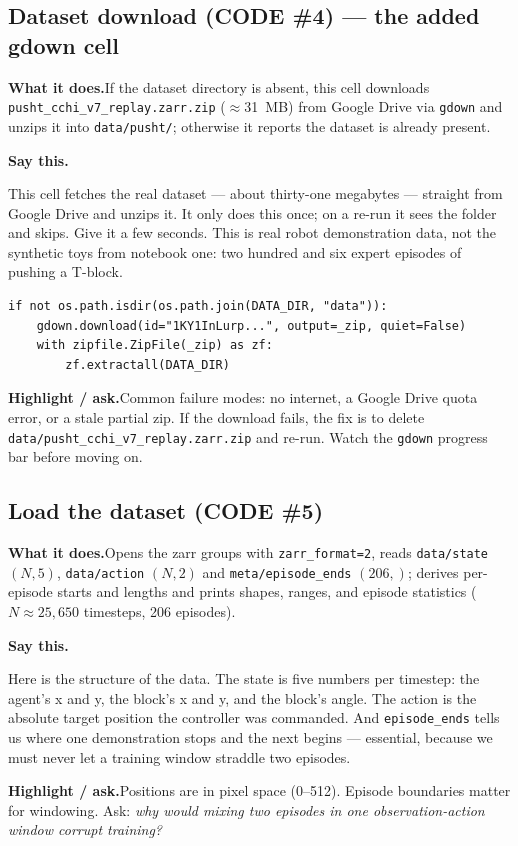 \documentclass[11pt]{article}
\newenvironment{saythis}{%
  \par\smallskip\noindent
  \begin{list}{}{%
    \setlength{\leftmargin}{1.2em}%
    \setlength{\rightmargin}{0.5em}%
    \setlength{\topsep}{2pt}%
  }\item\relax
  \color{sayrule}\textbf{Say this.}\hspace{0.4em}\color{black}\itshape
}{%
  \end{list}\par\smallskip
}
\newcommand{\highlight}[1]{\par\smallskip\noindent\textcolor{hlcolor}{\textbf{Highlight / ask.}}\hspace{0.4em}#1\par\smallskip}
\newcommand{\whatdoes}[1]{\par\noindent\textbf{What it does.}\hspace{0.4em}#1\par}
\begin{document}
\subsection{Dataset download (CODE \#4) --- the added gdown cell}
\whatdoes{If the dataset directory is absent, this cell downloads \texttt{pusht\_cchi\_v7\_replay.zarr.zip}
($\approx$31~MB) from Google Drive via \texttt{gdown} and unzips it into \texttt{data/pusht/}; otherwise it
reports the dataset is already present.}
\begin{saythis}
This cell fetches the real dataset --- about thirty-one megabytes --- straight from Google Drive and
unzips it. It only does this once; on a re-run it sees the folder and skips. Give it a few seconds. This
is real robot demonstration data, not the synthetic toys from notebook one: two hundred and six expert
episodes of pushing a T-block.
\end{saythis}
\begin{lstlisting}
if not os.path.isdir(os.path.join(DATA_DIR, "data")):
    gdown.download(id="1KY1InLurp...", output=_zip, quiet=False)
    with zipfile.ZipFile(_zip) as zf:
        zf.extractall(DATA_DIR)
\end{lstlisting}
\highlight{Common failure modes: no internet, a Google Drive quota error, or a stale partial zip. If the
download fails, the fix is to delete \texttt{data/pusht\_cchi\_v7\_replay.zarr.zip} and re-run. Watch the
\texttt{gdown} progress bar before moving on.}

\subsection{Load the dataset (CODE \#5)}
\whatdoes{Opens the zarr groups with \texttt{zarr\_format=2}, reads \texttt{data/state} $(N,5)$,
\texttt{data/action} $(N,2)$ and \texttt{meta/episode\_ends} $(206,)$; derives per-episode starts and
lengths and prints shapes, ranges, and episode statistics ($N\approx25{,}650$ timesteps, 206 episodes).}
\begin{saythis}
Here is the structure of the data. The state is five numbers per timestep: the agent's x and y, the
block's x and y, and the block's angle. The action is the absolute target position the controller was
commanded. And \texttt{episode\_ends} tells us where one demonstration stops and the next begins ---
essential, because we must never let a training window straddle two episodes.
\end{saythis}
\highlight{Positions are in pixel space (0--512). Episode boundaries matter for windowing. Ask:
\emph{why would mixing two episodes in one observation-action window corrupt training?}}
\end{document}
